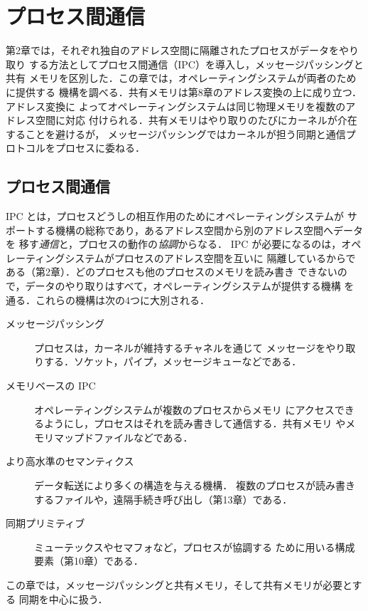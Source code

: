 \documentclass[../main.tex]{subfiles}
\begin{document}
\chapter{プロセス間通信}

第2章では，それぞれ独自のアドレス空間に隔離されたプロセスがデータをやり取り
する方法としてプロセス間通信（IPC）を導入し，メッセージパッシングと共有
メモリを区別した．この章では，オペレーティングシステムが両者のために提供する
機構を調べる．共有メモリは第8章のアドレス変換の上に成り立つ．アドレス変換に
よってオペレーティングシステムは同じ物理メモリを複数のアドレス空間に対応
付けられる．共有メモリはやり取りのたびにカーネルが介在することを避けるが，
メッセージパッシングではカーネルが担う同期と通信プロトコルをプロセスに委ねる．

\section{プロセス間通信}
\label{sec:l09-ipc}

IPC とは，プロセスどうしの相互作用のためにオペレーティングシステムが
サポートする機構の総称であり，あるアドレス空間から別のアドレス空間へデータを
移す\emph{通信}と，プロセスの動作の\emph{協調}からなる．%
IPC が必要になるのは，オペレーティングシステムがプロセスのアドレス空間を互いに
隔離しているからである（第2章）．どのプロセスも他のプロセスのメモリを読み書き
できないので，データのやり取りはすべて，オペレーティングシステムが提供する機構
を通る．これらの機構は次の4つに大別される．
\begin{description}
  \item[メッセージパッシング] プロセスは，カーネルが維持するチャネルを通じて
    メッセージをやり取りする．ソケット，パイプ，メッセージキューなどである．
  \item[メモリベースの IPC] オペレーティングシステムが複数のプロセスからメモリ
    にアクセスできるようにし，プロセスはそれを読み書きして通信する．共有メモリ
    やメモリマップドファイルなどである．
  \item[より高水準のセマンティクス] データ転送により多くの構造を与える機構．
    複数のプロセスが読み書きするファイルや，遠隔手続き呼び出し（第13章）である．
  \item[同期プリミティブ] ミューテックスやセマフォなど，プロセスが協調する
    ために用いる構成要素（第10章）である．
\end{description}
この章では，メッセージパッシングと共有メモリ，そして共有メモリが必要とする
同期を中心に扱う．
\end{document}
